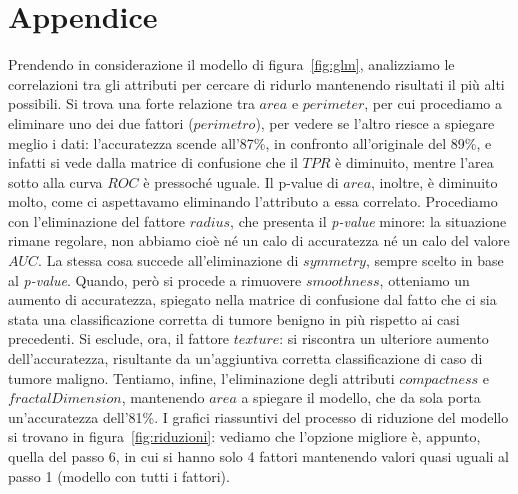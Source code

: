 \documentclass[11pt,a4paper,oneside]{article}
\begin{document}
\section{Appendice}
Prendendo in considerazione il modello di figura~\vref{fig:glm}, analizziamo le correlazioni tra gli attributi per cercare di ridurlo mantenendo risultati il più alti possibili. Si trova una forte relazione tra $area$ e $perimeter$, per cui procediamo a eliminare uno dei due fattori ($perimetro$), per vedere se l'altro riesce a spiegare meglio i dati: l'accuratezza scende all'87\%, in confronto all'originale del 89\%, e infatti si vede dalla matrice di confusione che il $TPR$ è diminuito, mentre l'area sotto alla curva $ROC$ è pressoché uguale. Il p-value di $area$, inoltre, è diminuito molto, come ci aspettavamo eliminando l'attributo a essa correlato. Procediamo con l'eliminazione del fattore $radius$, che presenta il \textit{p-value} minore: la situazione rimane regolare, non abbiamo cioè né un calo di accuratezza né un calo del valore $AUC$. La stessa cosa succede all'eliminazione di $symmetry$, sempre scelto in base al \textit{p-value}. Quando, però si procede a rimuovere $smoothness$, otteniamo un aumento di accuratezza, spiegato nella matrice di confusione dal fatto che ci sia stata una classificazione corretta di tumore benigno in più rispetto ai casi precedenti. Si esclude, ora, il fattore $texture$: si riscontra un ulteriore aumento dell'accuratezza, risultante da un'aggiuntiva corretta classificazione di caso di tumore maligno. Tentiamo, infine, l'eliminazione degli attributi $compactness$ e $fractalDimension$, mantenendo $area$ a spiegare il modello, che da sola porta un'accuratezza dell'81\%. I grafici riassuntivi del processo di riduzione del modello si trovano in figura~\ref{fig:riduzioni}: vediamo che l'opzione migliore è, appunto, quella del passo 6, in cui si hanno solo 4 fattori mantenendo valori quasi uguali al passo 1 (modello con tutti i fattori). 
\end{document}
